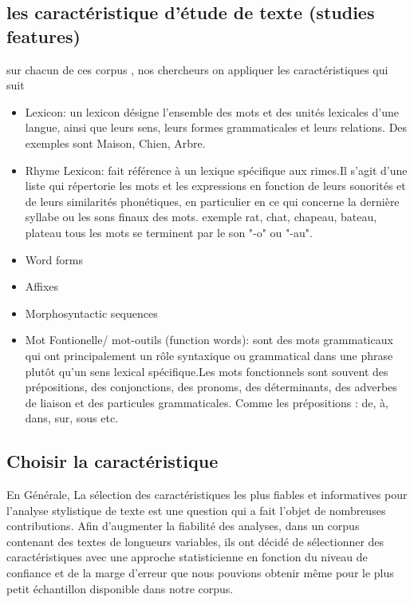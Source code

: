 \documentclass[]{report}
\begin{document}
\subsection{les caractéristique d'étude de texte (studies features)}
sur chacun de ces corpus , nos chercheurs on appliquer les caractéristiques qui
suit
\begin{itemize}
\item Lexicon: un lexicon désigne l'ensemble des mots et des unités lexicales
d'une langue, ainsi que leurs sens, leurs formes grammaticales et leurs
relations. Des exemples sont Maison, Chien, Arbre.
\item Rhyme Lexicon: fait référence à un lexique spécifique aux rimes.Il s'agit
d'une liste qui répertorie les mots et les expressions en fonction de leurs
sonorités et de leurs similarités phonétiques, en particulier en ce qui concerne
la dernière syllabe ou les sons finaux des mots. exemple  rat, chat, chapeau,
bateau, plateau 	tous les mots se terminent par le son "-o" ou "-au".
\item Word forms
	
\item Affixes
	
\item Morphosyntactic sequences 
	
\item Mot Fontionelle/ mot-outils (function words): sont des mots grammaticaux
qui ont principalement un rôle syntaxique ou grammatical dans une phrase plutôt
qu'un sens lexical spécifique.Les mots fonctionnels sont souvent des
prépositions, des conjonctions, des pronoms, des déterminants, des adverbes de
liaison et des particules grammaticales. Comme les prépositions : de, à, dans,
sur, sous etc.
\end{itemize}
\subsection{Choisir la caractéristique }
\vspace{\baselineskip}
\hspace{0,5cm} En Générale, La sélection des caractéristiques les plus fiables
et informatives pour l'analyse stylistique de texte est une question qui a fait
l'objet de nombreuses contributions.  Afin d'augmenter la fiabilité des
analyses, dans un corpus contenant des textes de longueurs variables, ils ont
décidé de sélectionner des caractéristiques  avec une approche  statisticienne
en fonction du niveau de confiance et de la marge d'erreur que nous pouvions
obtenir même pour le plus petit échantillon disponible dans notre corpus.
\end{document}
